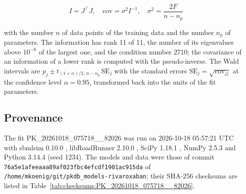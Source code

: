 \documentclass{article}
\begin{document}
\begin{equation}
I = J^\top J, \quad \mathrm{cov} = \sigma^2 I^{-1}, \quad \sigma^2 = \frac{2 F}{n - n_p}
\end{equation}

with the number $n$ of data points of the training data and the number $n_p$ of parameters. The information has rank 11 of 11, the number of its eigenvalues above $10^{-8}$ of the largest one, and the condition number 2710; the covariance of an information of a lower rank is computed with the pseudo-inverse. The Wald intervals are $\hat{p}_j \pm t_{(1+\alpha)/2,\, n-n_p}\, \mathrm{SE}_j$ with the standard errors $\mathrm{SE}_j = \sqrt{\mathrm{cov}_{jj}}$ at the confidence level $\alpha = 0.95$, transformed back into the units of the fit parameters.

\subsection{Provenance}

The fit PK\_20261018\_075718\_\_82026 was run on 2026-10-18 05:57:21 UTC with sbmlsim 0.10.0 \cite{Koenig2026_sbmlsim}, libRoadRunner 2.10.0 \cite{Welsh2023}, SciPy 1.18.1 \cite{Virtanen2020}, NumPy 2.5.3 \cite{Harris2020} and Python 3.14.4 (seed 1234). The models and data were those of commit \texttt{76a5e1afeeaaa89af023fbc4efcdf1901ac915da} of \texttt{/home/mkoenig/git/pkdb\_models-rivaroxaban}; their SHA-256 checksums are listed in Table~\ref{tab:checksums:PK_20261018_075718__82026}.
\end{document}
